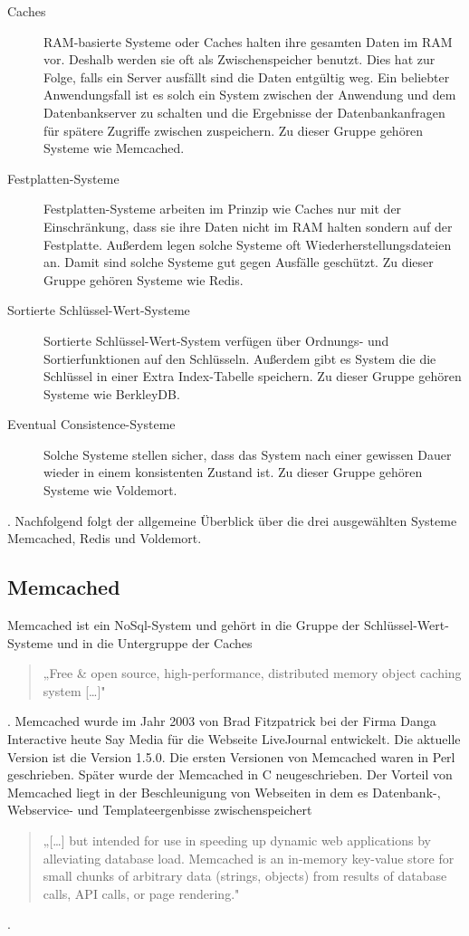 \begin{description}
    \item[Caches] \gls{RAM}-basierte Systeme oder Caches halten ihre gesamten
        Daten im \gls{RAM} vor. Deshalb werden sie oft als Zwischenspeicher
        benutzt. Dies hat zur Folge, falls ein Server ausfällt sind die Daten
        entgültig weg. Ein beliebter Anwendungsfall ist es solch ein System
        zwischen der Anwendung und dem Datenbankserver zu schalten und die
        Ergebnisse der Datenbankanfragen für spätere Zugriffe zwischen
        zuspeichern. Zu dieser Gruppe gehören Systeme wie Memcached.
    \item[Festplatten-Systeme] Festplatten-Systeme arbeiten im Prinzip wie Caches
        nur mit der Einschränkung, dass sie ihre Daten nicht im \gls{RAM} halten
        sondern auf der Festplatte. Außerdem legen solche Systeme oft
        Wiederherstellungsdateien an. Damit sind solche Systeme gut gegen
        Ausfälle geschützt. Zu dieser Gruppe gehören Systeme wie Redis.
    \item[Sortierte Schlüssel-Wert-Systeme] Sortierte Schlüssel-Wert-System
        verfügen über Ordnungs- und Sortierfunktionen auf den Schlüsseln.
        Außerdem gibt es System die die Schlüssel in einer Extra Index-Tabelle
        speichern. Zu dieser Gruppe gehören Systeme wie BerkleyDB.
    \item[Eventual Consistence-Systeme] Solche Systeme stellen sicher, dass das
        System nach einer gewissen Dauer wieder in einem konsistenten Zustand
        ist. Zu dieser Gruppe gehören Systeme wie Voldemort.
\end{description}

. Nachfolgend folgt der allgemeine Überblick über die drei ausgewählten Systeme
Memcached, Redis und Voldemort.

\subsection{Memcached}
Memcached ist ein NoSql-System und gehört in die Gruppe der
Schlüssel-Wert-Systeme und in die Untergruppe der Caches 
\begin{quote}
   „Free \& open source, high-performance, distributed memory object caching
    system [\dots]" \cite{Memcached2015} 
\end{quote}
. Memcached wurde im Jahr 2003 von Brad Fitzpatrick bei der Firma Danga
Interactive heute Say Media für die Webseite LiveJournal entwickelt. Die
aktuelle Version ist die Version 1.5.0. Die ersten Versionen von Memcached
waren in Perl geschrieben. Später wurde der Memcached in C neugeschrieben. Der
Vorteil von Memcached liegt in der Beschleunigung von Webseiten in dem es
Datenbank-, Webservice- und Templateergenbisse zwischenspeichert 
\begin{quote}
    „[\dots{}] but intended for use in speeding up dynamic web
applications by alleviating database load. Memcached is an in-memory key-value
store for small chunks of arbitrary data (strings, objects) from results of
database calls, API calls, or page rendering." \cite{Memcached2015}
\end{quote}
.

